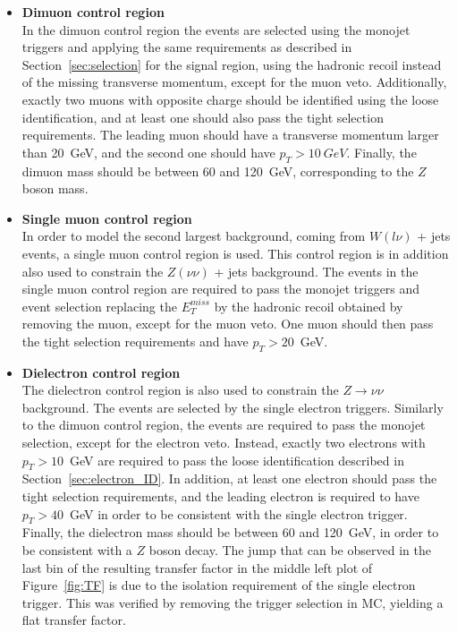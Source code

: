 \begin{itemize}
 \item[] \textbf{Dimuon control region}\\ In the dimuon control region the events are selected using the monojet triggers and applying the same requirements as described in Section~\ref{sec:selection} for the signal region, using the hadronic recoil instead of the missing transverse momentum, except for the muon veto. Additionally, exactly two muons with opposite charge should be identified using the loose identification, and at least one should also pass the tight selection requirements. The leading muon should have a transverse momentum larger than \SI{20}{GeV}, and the second one should have $p_T > \SI{10}{GeV}$. Finally, the dimuon mass should be between 60 and \SI{120}{GeV}, corresponding to the $Z$ boson mass.

\item[] \textbf{Single muon control region}\\ In order to model the second largest background, coming from $W(l\nu)$ + jets events, a single muon control region is used. This control region is in addition also used to constrain the $Z(\nu\nu)$ + jets background. The events in the single muon control region are required to pass the monojet triggers and event selection replacing the $E_T^{miss}$ by the hadronic recoil obtained by removing the muon, except for the muon veto. One muon should then pass the tight selection requirements and have $p_T > 20$~GeV.

\item[] \textbf{Dielectron control region}\\ The dielectron control region is also used to constrain the $Z\rightarrow\nu\nu$ background. The events are selected by the single electron triggers. Similarly to the dimuon control region, the events are required to pass the monojet selection, except for the electron veto. Instead, exactly two electrons with $p_T > 10$~GeV are required to pass the loose identification described in Section~\ref{sec:electron_ID}. In addition, at least one electron should pass the tight selection requirements, and the leading electron is required to have $p_T > 40$~GeV in order to be consistent with the single electron trigger. Finally, the dielectron mass should be between 60 and 120~GeV, in order to be consistent with a $Z$ boson decay. The jump that can be observed in the last bin of the resulting transfer factor in the middle left plot of Figure~\ref{fig:TF} is due to the isolation requirement of the single electron trigger. This was verified by removing the trigger selection in MC, yielding a flat transfer factor.


\end{itemize}
